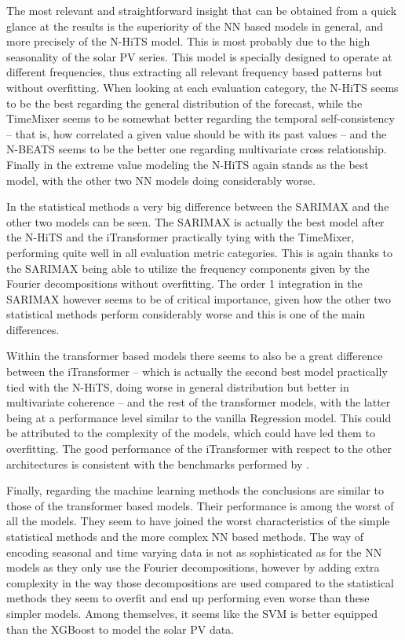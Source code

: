 The most relevant and straightforward insight that can be obtained from a quick glance at the results is the superiority of the NN based models in general, and more precisely of the N-HiTS model. This is most probably due to the high seasonality of the solar PV series. This model is specially designed to operate at different frequencies, thus extracting all relevant frequency based patterns but without overfitting. When looking at each evaluation category, the N-HiTS seems to be the best regarding the general distribution of the forecast, while the TimeMixer seems to be somewhat better regarding the temporal self-consistency -- that is, how correlated a given value should be with its past values -- and the N-BEATS seems to be the better one regarding multivariate cross relationship. Finally in the extreme value modeling the N-HiTS again stands as the best model, with the other two NN models doing considerably worse. 

In the statistical methods a very big difference between the SARIMAX and the other two models can be seen. The SARIMAX is actually the best model after the N-HiTS and the iTransformer practically tying with the TimeMixer, performing quite well in all evaluation metric categories. This is again thanks to the SARIMAX being able to utilize the frequency components given by the Fourier decompositions without overfitting. The order 1 integration in the SARIMAX however seems to be of critical importance, given how the other two statistical methods perform considerably worse and this is one of the main differences. 

Within the transformer based models there seems to also be a great difference between the iTransformer -- which is actually the second best model practically tied with the N-HiTS, doing worse in general distribution but better in multivariate coherence -- and the rest of the transformer models, with the latter being at a performance level similar to the vanilla Regression model. This could be attributed to the complexity of the models, which could have led them to overfitting. The good performance of the iTransformer with respect to the other architectures is consistent with the benchmarks performed by \cite{wang2024tssurvey}.  

Finally, regarding the machine learning methods the conclusions are similar to those of the transformer based models. Their performance is among the worst of all the models. They seem to have joined the worst characteristics of the simple statistical methods and the more complex NN based methods. The way of encoding seasonal and time varying data is not as sophisticated as for the NN models as they only use the Fourier decompositions, however by adding extra complexity in the way those decompositions are used compared to the statistical methods they seem to overfit and end up performing even worse than these simpler models. Among themselves, it seems like the SVM is better equipped than the XGBoost to model the solar PV data.


